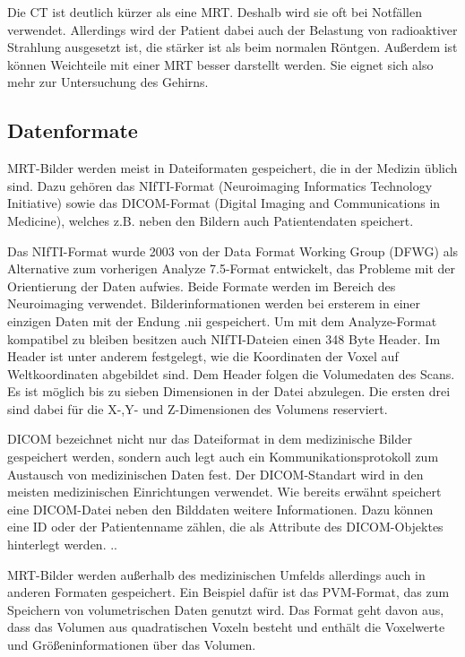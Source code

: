Die CT ist deutlich kürzer als eine MRT. Deshalb wird sie oft bei Notfällen verwendet. Allerdings wird der Patient dabei auch der Belastung von radioaktiver Strahlung ausgesetzt ist, die stärker ist als beim normalen Röntgen. Außerdem ist können Weichteile mit einer MRT besser darstellt werden. Sie eignet sich also mehr zur Untersuchung des Gehirns.


\subsection{Datenformate}

MRT-Bilder werden meist in Dateiformaten gespeichert, die in der Medizin üblich sind. Dazu gehören das NIfTI-Format (Neuroimaging Informatics Technology Initiative) sowie das DICOM-Format (Digital Imaging and Communications in Medicine), welches z.B. neben den Bildern auch Patientendaten speichert.

Das NIfTI-Format wurde 2003 von der Data Format Working Group (DFWG) als Alternative zum vorherigen Analyze 7.5-Format entwickelt, das Probleme mit der Orientierung der Daten aufwies. Beide Formate werden im Bereich des Neuroimaging verwendet.
Bilderinformationen werden bei ersterem in einer einzigen Daten mit der Endung .nii gespeichert. Um mit dem Analyze-Format kompatibel zu bleiben besitzen auch NIfTI-Dateien einen 348 Byte Header. Im Header ist unter anderem festgelegt, wie die Koordinaten der Voxel auf Weltkoordinaten abgebildet sind.
Dem Header folgen die Volumedaten des Scans. Es ist möglich bis zu sieben Dimensionen in der Datei abzulegen. Die ersten drei sind dabei für die X-,Y- und Z-Dimensionen des Volumens reserviert.

DICOM bezeichnet nicht nur das Dateiformat in dem medizinische Bilder gespeichert werden, sondern auch legt auch ein Kommunikationsprotokoll zum Austausch von medizinischen Daten fest. Der DICOM-Standart wird in den meisten medizinischen Einrichtungen verwendet. 
Wie bereits erwähnt speichert eine DICOM-Datei neben den Bilddaten weitere Informationen. Dazu können eine ID oder der Patientenname zählen, die als Attribute des DICOM-Objektes hinterlegt werden. 
..

MRT-Bilder werden außerhalb des medizinischen Umfelds allerdings auch in anderen Formaten gespeichert. 
Ein Beispiel dafür ist das PVM-Format, das zum Speichern von volumetrischen Daten genutzt wird. Das Format geht davon aus, dass das Volumen aus quadratischen Voxeln besteht und enthält die Voxelwerte und Größeninformationen über das Volumen.

